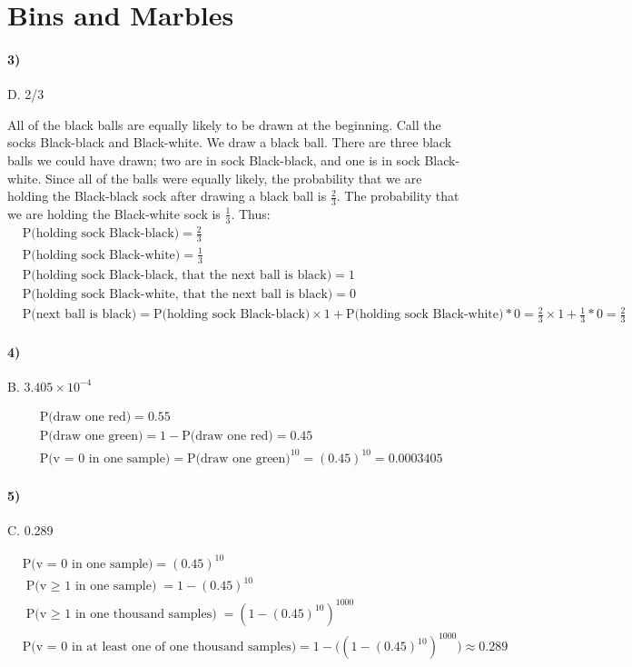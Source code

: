 \documentclass[10pt,letter]{article}
\begin{document}
\section*{Bins and Marbles}

\paragraph{3)} D. 2/3
	
	All of the black balls are equally likely to be drawn at the beginning. Call the socks Black-black and Black-white. We draw a black ball. There are three black balls we could have drawn; two are in sock Black-black, and one is in sock Black-white. Since all of the balls were equally likely, the probability that we are holding the Black-black sock after drawing a black ball is $\frac{2}{3}$. The probability that we are holding the Black-white sock is $\frac{1}{3}$. Thus:
	\begin{align*}
	&\text{P(holding sock Black-black)} = \frac{2}{3} \\
	&\text{P(holding sock Black-white)} = \frac{1}{3} \\
	&\text{P(holding sock Black-black, that the next ball is black)} = 1 \\
	&\text{P(holding sock Black-white, that the next ball is black)} = 0 \\
	&\text{P(next ball is black)} = \text{P(holding sock Black-black)} \times 1 +\text{P(holding sock Black-white)} * 0 
	= \frac{2}{3} \times 1 + \frac{1}{3} * 0 
	= \frac{2}{3} 
	\end{align*}

\paragraph{4)} B. $3.405 \times 10^{-4}$

	\begin{align*}
	&\text{P(draw one red)} = 0.55 \\
	&\text{P(draw one green)} = 1 - \text{P(draw one red)} = 0.45 \\
	&\text{P(v = 0 in one sample)} = \text{P(draw one green)}^{10} = (0.45)^{10} = 0.0003405
	\end{align*}

\paragraph{5)} C. 0.289

	\begin{align*}
	&\text{P(v = 0 in one sample)} = (0.45)^{10} \\
	&\text{P(v $\geq$ 1 in one sample)} = 1 - (0.45)^{10} \\
	&\text{P(v $\geq$ 1 in one thousand samples)} = (1 - (0.45)^{10})^{1000} \\
	&\text{P(v = 0 in at least one of one thousand samples)} = 1 - \Big((1 - (0.45)^{10})^{1000}\Big) \approx 0.289 \\
	\end{align*}
\end{document}
